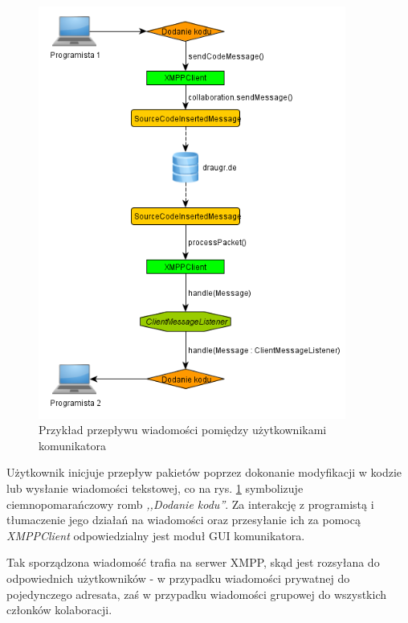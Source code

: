 \documentclass[polish,11pt,a4paper,twoside]{article}
\begin{document}
\begin{figure}[!htb]
  \begin{center}
    \includegraphics[width=0.9\textwidth]{img/komunikacja.png}
    \caption{Przykład przepływu wiadomości pomiędzy użytkownikami komunikatora} \label{fig:komunikacja} 
  \end{center}
\end{figure}

Użytkownik inicjuje przepływ pakietów poprzez dokonanie modyfikacji w kodzie lub wysłanie wiadomości tekstowej, co na rys. \ref{fig:komunikacja} symbolizuje ciemnopomarańczowy romb \emph{,,Dodanie kodu''}. Za interakcję z programistą i tłumaczenie jego działań na wiadomości oraz przesyłanie ich za pomocą \emph{XMPPClient} odpowiedzialny jest moduł GUI komunikatora.

Tak sporządzona wiadomość trafia na serwer XMPP, skąd jest rozsyłana do odpowiednich użytkowników - w przypadku wiadomości prywatnej do pojedynczego adresata, zaś w przypadku wiadomości grupowej do wszystkich członków kolaboracji.
\end{document}

